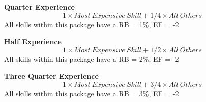 {\bf Quarter Experience}
\[ 1 \times Most\ Expensive\ Skill + 1/4 \times All\ Others \]
All skills within this package have a RB = 1\%, EF = -2 

{\bf Half Experience }
\[ 1 \times Most\ Expensive\ Skill + 1/2 \times All\ Others \]
All skills within this package have a RB = 2\%, EF = -2

{\bf Three Quarter Experience}
\[ 1 \times Most\ Expensive\ Skill + 3/4 \times All\ Others \] 
All skills within this package have a RB = 3\%, EF = -2


